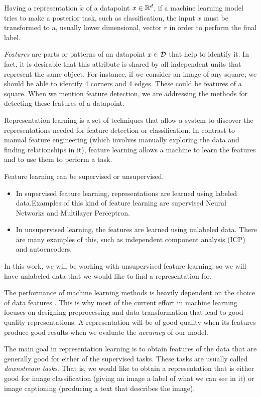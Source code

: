 Having a representation $\tilde{x}$ of a datapoint $x\in \mathbb{R}^d$, if a machine learning model
tries to make a posterior task, such as classification, the input $x$ must be transformed to a, usually lower dimensional, vector $r$ in order to perform the final label.

\emph{Features} are parts or patterns of an datapoint $x \in \mathcal{D}$ that help to identify it. In fact, it is desirable that this attribute is shared by all independent units that represent the same object. For instance, if we consider an image of any square, we should be able to identify 4 corners and 4 edges. These could be features of a square.
When we mention feature detection, we are addressing the methods for detecting these features of a datapoint.

Representation learning is a set of techniques that allow a system to discover the representations needed for feature detection or classification. 
In contrast to manual feature engineering (which involves manually exploring the data and finding relationships in it), feature learning allows a machine to learn the features and to use them to perform a task.

Feature learning can be supervised or unsupervised. 
\begin{itemize}
    \item In supervised feature learning, representations are learned using labeled data.Examples of this kind of feature learning are supervised Neural Networks and Multilayer Perceptron. 
    \item In unsupervised learning, the features are learned using unlabeled data. There are many examples of this, such as independent component analysis (ICP) and autoencoders.
\end{itemize}
 In this work, we will be working with unsupervised feature learning, so we will have unlabeled data that we would like to find a representation for.


The performance of machine learning methods is heavily dependent on the choice of data features \citep{bengio_representation_2014}. This is why most of the current 
effort in machine learning focuses on designing preprocessing and data transformation that lead to good quality representations. A representation will be of good quality when its features
produce good results when we evaluate the \emph{accuracy} of our model.

The main goal in representation learning is to obtain features of the data that are generally good for either of the supervised tasks. These tasks are usually called \emph{downstream tasks}. That is, we would like to obtain
a representation that is either good for image classification (giving an image a label of what we can see in it) or image captioning (producing a text that describes the image).

